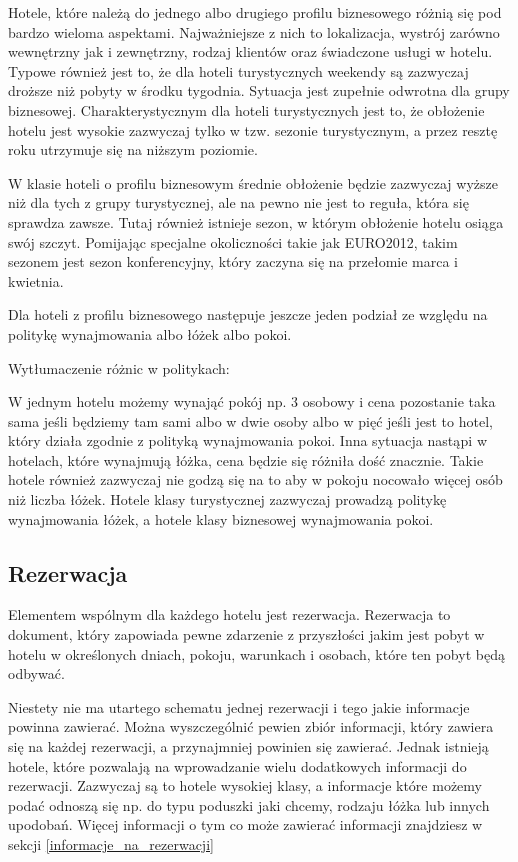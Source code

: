 \documentclass[a4paper,onecolumn,oneside,11pt,wide,floatssmall]{mwrep}
\theoremstyle{definition}
\theoremstyle{plain}%
\theoremstyle{remark}
\begin{document}
Hotele, które należą do jednego albo drugiego profilu biznesowego różnią się pod
bardzo wieloma aspektami. Najważniejsze z nich to lokalizacja, wystrój
zarówno wewnętrzny jak i zewnętrzny, rodzaj klientów oraz świadczone usługi
w hotelu. Typowe również jest to, że dla hoteli turystycznych weekendy są zazwyczaj
 droższe niż pobyty w środku tygodnia. Sytuacja jest zupełnie odwrotna dla grupy
 biznesowej. Charakterystycznym dla hoteli turystycznych jest to, że obłożenie
 hotelu jest wysokie zazwyczaj tylko w tzw. sezonie turystycznym, a przez resztę
 roku utrzymuje się na niższym poziomie.
 
 W klasie hoteli o profilu biznesowym średnie obłożenie będzie zazwyczaj wyższe
 niż dla tych z grupy turystycznej, ale na pewno nie jest to reguła, która się
  sprawdza zawsze. Tutaj również istnieje sezon, w którym obłożenie hotelu
  osiąga swój szczyt. Pomijając specjalne okoliczności takie jak EURO2012, takim
  sezonem jest sezon konferencyjny, który zaczyna się na przełomie marca i kwietnia.
  
  Dla hoteli z profilu biznesowego następuje 
 jeszcze jeden podział ze względu na politykę wynajmowania albo łóżek albo pokoi.
   
 Wytłumaczenie różnic w politykach:
 
 W jednym hotelu możemy wynająć pokój np.
 3 osobowy i cena pozostanie taka sama jeśli będziemy tam sami albo w dwie osoby albo w pięć jeśli jest to hotel,
  który działa zgodnie z polityką wynajmowania pokoi. Inna sytuacja nastąpi w hotelach, które wynajmują łóżka,
   cena będzie się różniła dość znacznie. Takie hotele również
   zazwyczaj nie godzą się na to aby w pokoju nocowało więcej osób niż liczba łóżek. 
   Hotele klasy turystycznej zazwyczaj prowadzą politykę wynajmowania łóżek, a hotele klasy biznesowej wynajmowania pokoi.

\subsection{Rezerwacja}
Elementem wspólnym dla każdego hotelu jest rezerwacja.
Rezerwacja to dokument, który zapowiada pewne zdarzenie
z przyszłości jakim jest pobyt w hotelu w określonych dniach,
pokoju, warunkach i osobach, które ten pobyt będą odbywać.

Niestety nie ma utartego schematu jednej rezerwacji i tego jakie informacje
powinna zawierać. Można wyszczególnić pewien zbiór informacji, który zawiera się
na każdej rezerwacji, a przynajmniej powinien się zawierać. Jednak istnieją
hotele, które pozwalają na wprowadzanie wielu dodatkowych informacji do
rezerwacji. Zazwyczaj są to hotele wysokiej klasy, a informacje które możemy
podać odnoszą się np. do typu poduszki jaki chcemy, rodzaju łóżka lub innych
upodobań. Więcej informacji o tym co może zawierać informacji znajdziesz w
sekcji \ref{informacje_na_rezerwacji}
\end{document}
